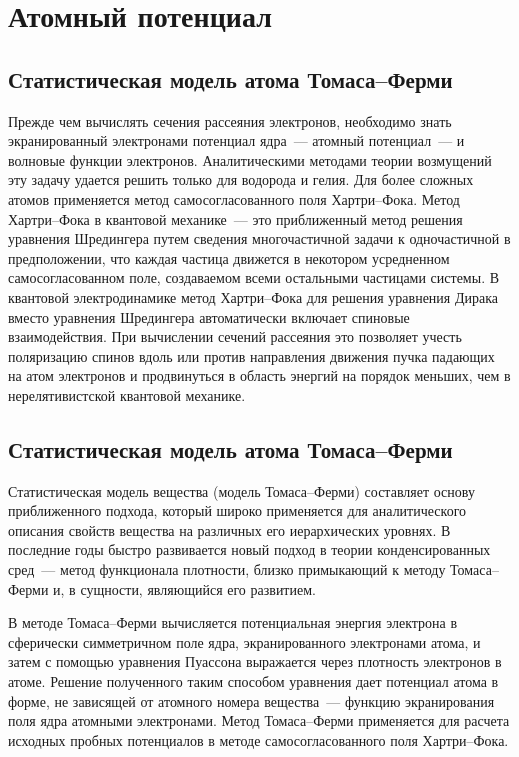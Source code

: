 \chapter{Атомный потенциал}

  \section{Статистическая модель атома Томаса--Ферми}

  Прежде чем вычислять сечения рассеяния электронов, необходимо знать
  экранированный электронами потенциал ядра~--- атомный потенциал~--- и волновые
  функции электронов. Аналитическими методами теории возмущений эту задачу
  удается решить только для водорода и гелия. Для более сложных атомов
  применяется метод самосогласованного поля Хартри--Фока. Метод Хартри--Фока в
  квантовой механике~--- это приближенный метод решения уравнения Шредингера
  путем сведения многочастичной задачи к одночастичной в предположении, что
  каждая частица движется в некотором усредненном самосогласованном поле,
  создаваемом всеми остальными частицами системы. В квантовой электродинамике
  метод Хартри--Фока для решения уравнения Дирака вместо уравнения Шредингера
  автоматически включает спиновые взаимодействия. При вычислении сечений
  рассеяния это позволяет учесть поляризацию спинов вдоль или против направления
  движения пучка падающих на атом электронов и продвинуться в область энергий на
  порядок меньших, чем в нерелятивистской квантовой механике.
  
  \section{Статистическая модель атома Томаса--Ферми}

  Статистическая модель вещества (модель Томаса--Ферми) составляет основу
  приближенного подхода, который широко применяется для аналитического описания
  свойств вещества на различных его иерархических уровнях. В последние годы
  быстро развивается новый подход в теории конденсированных сред~--- метод
  функционала плотности, близко примыкающий к методу Томаса--Ферми и, в
  сущности, являющийся его развитием.
  
  В методе Томаса--Ферми вычисляется потенциальная энергия электрона в
  сферически симметричном поле ядра, экранированного электронами атома, и затем
  с помощью уравнения Пуассона выражается через плотность электронов в атоме.
  Решение полученного таким способом уравнения дает потенциал атома в форме, не
  зависящей от атомного номера вещества~--- функцию экранирования поля ядра
  атомными электронами. Метод Томаса--Ферми применяется для расчета исходных
  пробных потенциалов в методе самосогласованного поля Хартри--Фока.
  
